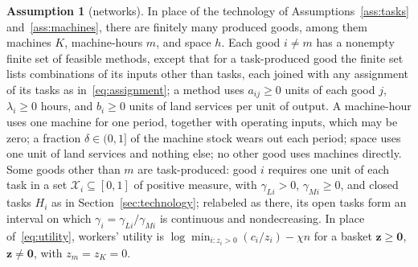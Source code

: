 \documentclass[12pt]{article}
\theoremstyle{plain}
\theoremstyle{definition}
\newtheorem{assumption}{Assumption}
\theoremstyle{remark}
\begin{document}
\begin{assumption}[networks]\label{ass:network}
In place of the technology of Assumptions~\ref{ass:tasks} and~\ref{ass:machines}, there are finitely many produced goods, among them machines $K$, machine-hours $m$, and space $h$. Each good $i\ne m$ has a nonempty finite set of feasible methods, except that for a task-produced good the finite set lists combinations of its inputs other than tasks, each joined with any assignment of its tasks as in~\eqref{eq:assignment}; a method uses $a_{ij}\ge0$ units of each good $j$, $\lambda_i\ge0$ hours, and $b_i\ge0$ units of land services per unit of output. A machine-hour uses one machine for one period, together with operating inputs, which may be zero; a fraction $\delta\in(0,1]$ of the machine stock wears out each period; space uses one unit of land services and nothing else; no other good uses machines directly. Some goods other than $m$ are task-produced: good $i$ requires one unit of each task in a set $\mathcal X_i\subseteq[0,1]$ of positive measure, with $\gamma_{Li}>0$, $\gamma_{Mi}\ge0$, and closed tasks $H_i$ as in Section~\ref{sec:technology}; relabeled as there, its open tasks form an interval on which $\gamma_i=\gamma_{Li}/\gamma_{Mi}$ is continuous and nondecreasing. In place of~\eqref{eq:utility}, workers' utility is $\log\min_{i:z_i>0}(c_i/z_i)-\chi n$ for a basket $\mathbf z\ge\mathbf 0$, $\mathbf z\ne\mathbf 0$, with $z_m=z_K=0$.
\end{assumption}
\end{document}
